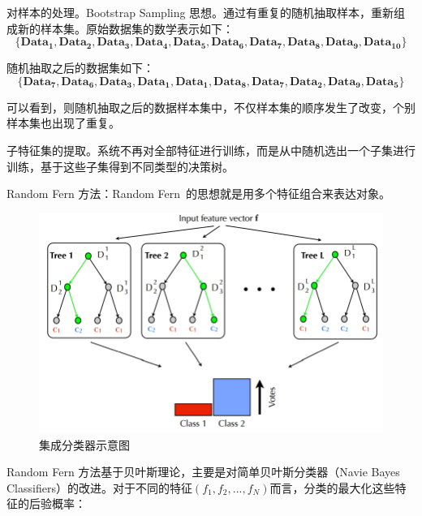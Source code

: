 对样本的处理。Bootstrap Sampling 思想。通过有重复的随机抽取样本，重新组成新的样本集。原始数据集的数学表示如下：
$$\mathbf{\{Dat}{{\mathbf{a}}_{\mathbf{1}}}\mathbf{,Dat}{{\mathbf{a}}_{\mathbf{2}}}\mathbf{,Dat}{{\mathbf{a}}_{\mathbf{3}}}\mathbf{,Dat}{{\mathbf{a}}_{\mathbf{4}}}\mathbf{,Dat}{{\mathbf{a}}_{\mathbf{5}}}\mathbf{,Dat}{{\mathbf{a}}_{\mathbf{6}}}\mathbf{,Dat}{{\mathbf{a}}_{\mathbf{7}}}\mathbf{,Dat}{{\mathbf{a}}_{\mathbf{8}}}\mathbf{,Dat}{{\mathbf{a}}_{\mathbf{9}}}\mathbf{,Dat}{{\mathbf{a}}_{\mathbf{10}}}\mathbf{\}}$$

随机抽取之后的数据集如下：
$$\mathbf{\{Dat}{{\mathbf{a}}_{\mathbf{7}}}\mathbf{,Dat}{{\mathbf{a}}_{\mathbf{6}}}\mathbf{,Dat}{{\mathbf{a}}_{\mathbf{3}}}\mathbf{,Dat}{{\mathbf{a}}_{\mathbf{1}}}\mathbf{,Dat}{{\mathbf{a}}_{\mathbf{1}}}\mathbf{,Dat}{{\mathbf{a}}_{\mathbf{8}}}\mathbf{,Dat}{{\mathbf{a}}_{\mathbf{7}}}\mathbf{,Dat}{{\mathbf{a}}_{\mathbf{2}}}\mathbf{,Dat}{{\mathbf{a}}_{\mathbf{9}}}\mathbf{,Dat}{{\mathbf{a}}_{\mathbf{5}}}\mathbf{\}}$$

可以看到，则随机抽取之后的数据样本集中，不仅样本集的顺序发生了改变，个别样本集也出现了重复。

子特征集的提取。系统不再对全部特征进行训练，而是从中随机选出一个子集进行训练，基于这些子集得到不同类型的决策树。


Random Fern 方法：Random Fern 的思想就是用多个特征组合来表达对象。


\begin{figure}[ht]   
	\centering
	\includegraphics[width=\textwidth]{figs/161002_Thesis_Tracking_Section_05.pdf}
	\caption{集成分类器示意图}
	\label{fig:161002_Thesis_Tracking_Section_05}
\end{figure}

Random Fern 方法基于贝叶斯理论，主要是对简单贝叶斯分类器（Navie Bayes Classifiers）的改进。对于不同的特征$(f_1, f_2, ..., f_N)$而言，分类的最大化这些特征的后验概率：

